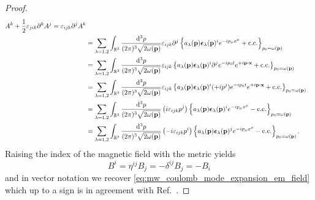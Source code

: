 \begin{proof}
\begin{equation*}
\begin{split}
			A^k
			+
			\frac{1}{2}
			\varepsilon_{jik}
			\partial^k
			A^j
			=
			\varepsilon_{ijk}
			\partial^j
			A^k
			\\
			&=
			\sum_{\lambda=1,2}
			\int_{\mathbb{R}^3}\frac{\dd[3]{p}}{(2\pi)^3\sqrt{2\omega(\vb{p})}}
			\varepsilon_{ijk}
			\partial^j
			\left\{
				a_\lambda(\vb{p})
				\boldsymbol{\epsilon}_\lambda(\vb{p})^i
				e^{-ip_\mu x^\mu}
				+
				\text{c.c.}
			\right\}_{p_0=\omega(\vb{p})}
			\\
			&=
			\sum_{\lambda=1,2}
			\int_{\mathbb{R}^3}\frac{\dd[3]{p}}{(2\pi)^3\sqrt{2\omega(\vb{p})}}
			\varepsilon_{ijk}
			\left\{
				a_\lambda(\vb{p})
				\boldsymbol{\epsilon}_\lambda(\vb{p})^i
				\partial^j
				e^{-ip_0t}
				e^{+i\vb{p}\vdot\vb{x}}
				+
				\text{c.c.}
			\right\}_{p_0=\omega(\vb{p})}
			\\
			&=
			\sum_{\lambda=1,2}
			\int_{\mathbb{R}^3}\frac{\dd[3]{p}}{(2\pi)^3\sqrt{2\omega(\vb{p})}}
			\varepsilon_{ijk}
			\left\{
				a_\lambda(\vb{p})
				\boldsymbol{\epsilon}_\lambda(\vb{p})^i
				(+ip^j)
				e^{-ip_0t}
				e^{+i\vb{p}\vdot\vb{x}}
				+
				\text{c.c.}
			\right\}_{p_0=\omega(\vb{p})}
			\\
			&=
			\sum_{\lambda=1,2}
			\int_{\mathbb{R}^3}\frac{\dd[3]{p}}{(2\pi)^3\sqrt{2\omega(\vb{p})}}
			\left(
				i
				\varepsilon_{ijk}
				p^j
			\right)
			\left\{
				a_\lambda(\vb{p})
				\boldsymbol{\epsilon}_\lambda(\vb{p})^i
				e^{-ip_\mu x^\mu}
				-
				\text{c.c.}
			\right\}_{p_0=\omega(\vb{p})}
			\\
			&=
			\sum_{\lambda=1,2}
			\int_{\mathbb{R}^3}\frac{\dd[3]{p}}{(2\pi)^3\sqrt{2\omega(\vb{p})}}
			\left(
				-i
				\varepsilon_{ijk}
				p^i
			\right)
			\left\{
				a_\lambda(\vb{p})
				\boldsymbol{\epsilon}_\lambda(\vb{p})^j
				e^{-ip_\mu x^\mu}
				-
				\text{c.c.}
			\right\}_{p_0=\omega(\vb{p})}
			.
		\end{split}
	\end{equation*}
	Raising the index of the magnetic field with the metric yields
	\begin{equation*}
		B^i
		=
		\eta^{ij}
		B_j
		=
		-
		\delta^{ij}
		B_j
		=
		-
		B_i
	\end{equation*}
	and in vector notation we recover \cref{eq:mw_coulomb_mode_expansion_em_field} which up to a sign is in agreement with Ref.~\cite[p.~198]{Greiner2013}.
\end{proof}

